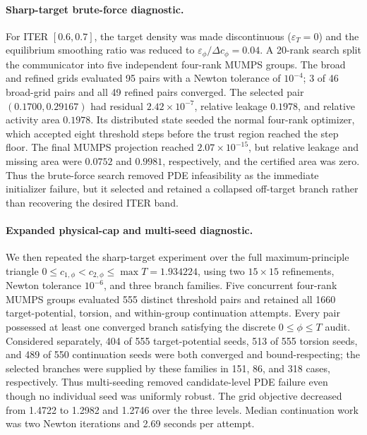 \paragraph{Sharp-target brute-force diagnostic.}
For ITER $[0.6,0.7]$, the target density was made discontinuous
($\varepsilon_T=0$) and the equilibrium smoothing ratio was reduced to
$\varepsilon_\phi/\Delta c_\phi=0.04$.  A 20-rank search split the communicator
into five independent four-rank MUMPS groups.  The broad and refined grids
evaluated 95 pairs with a Newton tolerance of $10^{-4}$; 3 of 46 broad-grid
pairs and all 49 refined pairs converged.  The selected pair
$(0.1700,0.29167)$ had residual $2.42\times10^{-7}$, relative leakage $0.1978$,
and relative activity area $0.1978$.  Its distributed state seeded the normal
four-rank optimizer, which accepted eight threshold steps before the trust
region reached the step floor.  The final MUMPS projection reached
$2.07\times10^{-15}$, but relative leakage and missing area were $0.0752$ and
$0.9981$, respectively, and the certified area was zero.  Thus the brute-force
search removed PDE infeasibility as the immediate initializer failure, but it
selected and retained a collapsed off-target branch rather than recovering the
desired ITER band.

\paragraph{Expanded physical-cap and multi-seed diagnostic.}
We then repeated the sharp-target experiment over the full maximum-principle
triangle $0\leq c_{1,\phi}<c_{2,\phi}\leq\max T=1.934224$, using two
$15\times15$ refinements, Newton tolerance $10^{-6}$, and three branch
families.  Five concurrent four-rank MUMPS groups evaluated 555 distinct
threshold pairs and retained all 1660 target-potential, torsion, and
within-group continuation attempts.  Every pair possessed at least one
converged branch satisfying the discrete $0\leq\phi\leq T$ audit.  Considered
separately, 404 of 555 target-potential seeds, 513 of 555 torsion seeds, and
489 of 550 continuation seeds were both converged and bound-respecting; the
selected branches were supplied by these families in 151, 86, and 318 cases,
respectively.  Thus multi-seeding removed candidate-level PDE failure even
though no individual seed was uniformly robust.  The grid objective decreased
from 1.4722 to 1.2982 and 1.2746 over the three levels.  Median continuation
work was two Newton iterations and 2.69 seconds per attempt.

